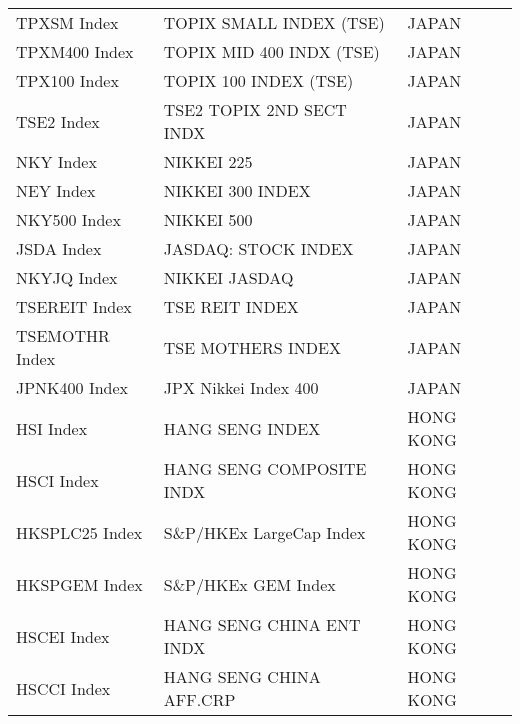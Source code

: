 \begin {table}[H]
\begin{center}
\begin{tabu}{| l l l |}
TPXSM Index & TOPIX SMALL INDEX (TSE) & JAPAN \\ 
TPXM400 Index & TOPIX MID 400 INDX (TSE) & JAPAN \\ 
TPX100 Index & TOPIX 100 INDEX (TSE) & JAPAN \\ 
TSE2 Index & TSE2 TOPIX 2ND SECT INDX & JAPAN \\ 
NKY Index & NIKKEI 225 & JAPAN \\ 
NEY Index & NIKKEI 300 INDEX & JAPAN \\ 
NKY500 Index & NIKKEI 500 & JAPAN \\ 
JSDA Index & JASDAQ: STOCK INDEX & JAPAN \\ 
NKYJQ Index & NIKKEI JASDAQ & JAPAN \\ 
TSEREIT Index & TSE REIT INDEX & JAPAN \\ 
TSEMOTHR Index & TSE MOTHERS INDEX & JAPAN \\ 
JPNK400 Index & JPX Nikkei Index 400 & JAPAN \\ 
HSI Index & HANG SENG INDEX & HONG KONG \\ 
HSCI Index & HANG SENG COMPOSITE INDX & HONG KONG \\ 
HKSPLC25 Index & S\&P/HKEx LargeCap Index & HONG KONG \\ 
HKSPGEM Index & S\&P/HKEx GEM Index & HONG KONG \\ 
HSCEI Index & HANG SENG CHINA ENT INDX & HONG KONG \\ 
HSCCI Index & HANG SENG CHINA AFF.CRP & HONG KONG \\ 

\hline
\end{tabu}
\hspace*{-3cm}
\small
\end{center}
\end{table}



